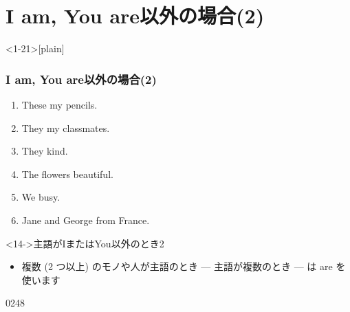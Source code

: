 \documentclass[aspectratio=169,xcolor={dvipsnames,table}]{beamer}
\begin{document}
\section{I am, You are以外の場合(2)}

\begin{frame}<1-21>[plain]\frametitle{I am, You are以外の場合(2)}
  \begin{enumerate}
   \item<1-> These \textbf{\color{Maroon}{are}} my pencils. \hfill{}
   \item<1-> They \textbf{\color{Maroon}{are}} my classmates. \hfill{}
   \item<1-> They \textbf{\color{Maroon}{are}} kind. \hfill{}
   \item<1-> The flowers \textbf{\color{Maroon}{are}} beautiful. \hfill{}
   \item<1-> We \textbf{\color{Maroon}{are}} busy. \hfill{}
   \item<1-> Jane and George \textbf{\color{Maroon}{are}} from France. \hfill{}
  \end{enumerate}

\bigskip

\begin{block}<14->{主語がIまたはYou以外のとき2}
\begin{itemize}[square]
 \item   複数 (2 つ以上) のモノや人が主語のとき — 主語が複数のとき — は
are を使います
\end{itemize}
     \end{block}


\hfill{\tiny 0248}\,{\scriptsize {}}

\end{frame}
\end{document}
